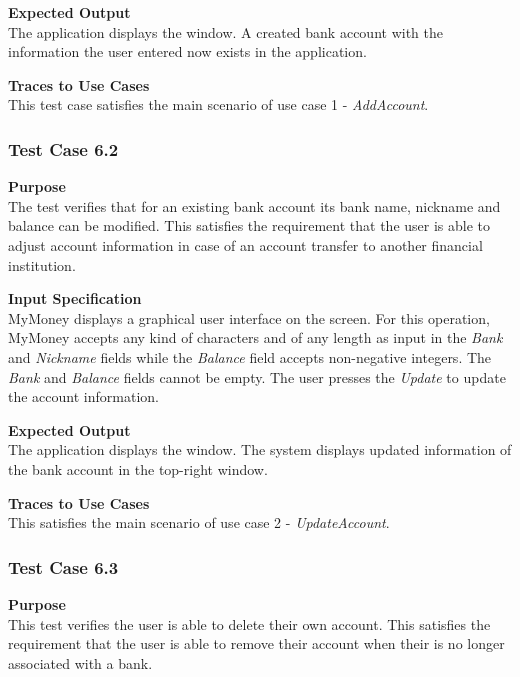 \documentclass[12pt]{article}
\begin{document}
\noindent
    {\bf Expected Output}\\
    The application displays the window.
    A created bank account with the information the user entered now exists in the application.
    
\noindent
    {\bf Traces to Use Cases}\\
    This test case satisfies the main scenario of use case 1 - \textit{AddAccount}.

\subsubsection{Test Case 6.2} \label{6.2}
\noindent
{\bf Purpose}\\
        The test verifies that for an existing bank account its bank name, nickname and balance can be modified.
        This satisfies the requirement that the user is able to adjust account information in case of an account transfer
        to another financial institution. 

\noindent
{\bf Input Specification}\\
            MyMoney displays a graphical user interface on the screen.
            For this operation, MyMoney accepts any kind of characters and of any length as
            input in the \textit{Bank} and \textit{Nickname} fields while the \textit{Balance} field accepts non-negative integers.
            The \textit{Bank} and \textit{Balance} fields cannot be empty. The user presses the \textit{Update} to update the account information.
            
\noindent
{\bf Expected Output}\\
    The application displays the window.    
    The system displays updated information of the bank account in the top-right window.

 \noindent
 {\bf Traces to Use Cases}\\
     This satisfies the main scenario of use case 2 - \textit{UpdateAccount}.
                    

\clearpage %
\subsubsection{Test Case 6.3} \label{6.3}
\noindent
{\bf Purpose}\\
 This test verifies the user is able to delete their own account.
 This satisfies the requirement that the user is able to remove their account when their is no longer associated
 with a bank. 
\end{document}
